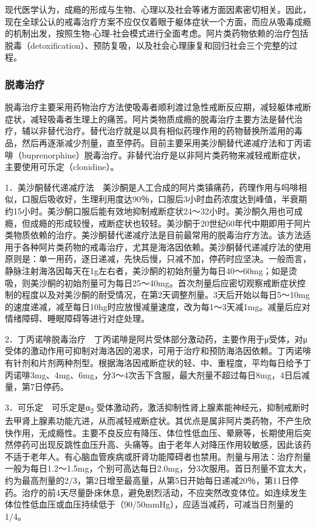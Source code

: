 现代医学认为，成瘾的形成与生物、心理以及社会等诸方面因素密切相关。因此，现在全球公认的戒毒治疗方案不应仅仅着眼于躯体症状一个方面，而应从吸毒成瘾的机制出发，按照生物-心理-社会模式进行全面考虑。阿片类药物依赖的治疗包括脱毒（detoxification）、预防复吸，以及社会心理康复和回归社会三个完整的过程。

\subsubsection{脱毒治疗}

脱毒治疗主要采用药物治疗方法使吸毒者顺利渡过急性戒断反应期，减轻躯体戒断症状，减轻吸毒者生理上的痛苦。阿片类物质成瘾的脱毒治疗主要方法是替代治疗，辅以非替代治疗。替代治疗就是以具有相似药理作用的药物替换所滥用的毒品，然后再逐渐减少剂量，直至停药。目前主要采用美沙酮替代递减疗法和丁丙诺啡（buprenorphine）脱毒治疗。非替代治疗是以非阿片类药物来减轻戒断症状，主要使用可乐定（clonidine）。

1．美沙酮替代递减疗法　美沙酮是人工合成的阿片类镇痛药，药理作用与吗啡相似，口服后吸收好，生理利用度达90％，口服后3小时血药浓度达到峰值，半衰期约15小时。美沙酮口服后能有效地抑制戒断症状24～32小时。美沙酮久用也可成瘾，但成瘾的形成较慢，戒断症状也较轻。美沙酮于20世纪60年代中期即用于阿片类物质依赖的治疗。美沙酮替代递减疗法是目前最常用的脱毒治疗方法。该方法适用于各种阿片类药物的戒毒治疗，尤其是海洛因依赖。美沙酮替代递减疗法的使用原则是：单一用药，逐日递减，先快后慢，只减不加，停药时应坚决。一般而言，静脉注射海洛因每天在1g左右者，美沙酮的初始剂量为每日40～60mg；如是烫吸，则美沙酮的初始剂量可为每日25～40mg。首次剂量后应密切观察戒断症状控制的程度以及对美沙酮的耐受情况，在第2天调整剂量。3天后开始以每日5～10mg的速度递减，减至每日10hg时应放慢减量速度，改为每1～3天减1mg。减量后应对情绪障碍、睡眠障碍等进行对症处理。

2．丁丙诺啡脱毒治疗　丁丙诺啡是阿片受体部分激动药，主要作用于μ受体，对μ受体的激动作用可抑制对海洛因的渴求，可用于治疗和预防海洛因依赖。丁丙诺啡有针剂和片剂两种剂型。根据海洛因戒断症状的轻、中、重程度，平均每日给予丁丙诺啡3mg、4mg、6mg，分3～4次舌下含服，最大剂量不超过每日8mg，4日后减量，第7日停药。

3．可乐定　可乐定是α\textsubscript{2}
受体激动药，激活抑制性肾上腺素能神经元，抑制戒断时去甲肾上腺素功能亢进，从而减轻戒断症状。其优点是属非阿片类药物，不产生欣快作用，无成瘾性。主要不良反应有降压、体位性低血压、晕厥等，长期使用后突然停药可出现反跳性血压升高、头痛等。由于老年人对降压作用较敏感，因此该药不适于老年人。有心脑血管疾病或肝肾功能障碍者也禁用。剂量与用法：治疗剂量一般为每日1.2～1.5mg，个别可高达每日2.0mg，分3次服用。首日剂量不宜太大，约为最高剂量的2/3，第2日增至最高量，从第5日开始每日递减20％，第11日停药。治疗的前4天尽量卧床休息，避免剧烈活动，不应突然改变体位。如连续发生体位性低血压或血压持续低于（90/50mmHg），应适当减药，可减当日剂量的1/4。

